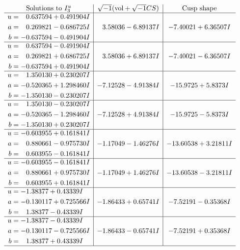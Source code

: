 \documentclass[1p]{elsarticle_modified}
\theoremstyle{definition}
\newcommand{\I}{\sqrt{-1}}
\begin{document}
$$\begin{array}{c|c|c}  
\text{Solutions to }I^u_{3}& \I (\text{vol} + \sqrt{-1}CS) & \text{Cusp shape}\\
 \hline 
\begin{aligned}
u &= \phantom{-}0.637594 + 0.491904 I \\
a &= \phantom{-}0.269821 - 0.686725 I \\
b &= -0.637594 - 0.491904 I\end{aligned}
 & \phantom{-}3.58036 - 6.89137 I & -7.40021 + 6.36507 I \\ \hline\begin{aligned}
u &= \phantom{-}0.637594 - 0.491904 I \\
a &= \phantom{-}0.269821 + 0.686725 I \\
b &= -0.637594 + 0.491904 I\end{aligned}
 & \phantom{-}3.58036 + 6.89137 I & -7.40021 - 6.36507 I \\ \hline\begin{aligned}
u &= \phantom{-}1.350130 + 0.230207 I \\
a &= -0.520365 + 1.298460 I \\
b &= -1.350130 - 0.230207 I\end{aligned}
 & -7.12528 - 4.91384 I & -15.9725 + 5.8373 I \\ \hline\begin{aligned}
u &= \phantom{-}1.350130 - 0.230207 I \\
a &= -0.520365 - 1.298460 I \\
b &= -1.350130 + 0.230207 I\end{aligned}
 & -7.12528 + 4.91384 I & -15.9725 - 5.8373 I \\ \hline\begin{aligned}
u &= -0.603955 + 0.161841 I \\
a &= \phantom{-}0.880661 - 0.975730 I \\
b &= \phantom{-}0.603955 - 0.161841 I\end{aligned}
 & -1.17049 - 1.46276 I & -13.60538 + 3.21811 I \\ \hline\begin{aligned}
u &= -0.603955 - 0.161841 I \\
a &= \phantom{-}0.880661 + 0.975730 I \\
b &= \phantom{-}0.603955 + 0.161841 I\end{aligned}
 & -1.17049 + 1.46276 I & -13.60538 - 3.21811 I \\ \hline\begin{aligned}
u &= -1.38377 + 0.43339 I \\
a &= -0.130117 + 0.725566 I \\
b &= \phantom{-}1.38377 - 0.43339 I\end{aligned}
 & -1.86433 + 0.65741 I & -7.52191 - 0.35368 I \\ \hline\begin{aligned}
u &= -1.38377 - 0.43339 I \\
a &= -0.130117 - 0.725566 I \\
b &= \phantom{-}1.38377 + 0.43339 I\end{aligned}
 & -1.86433 - 0.65741 I & -7.52191 + 0.35368 I\\
 \hline 
 \end{array}$$\newpage
\end{document}
